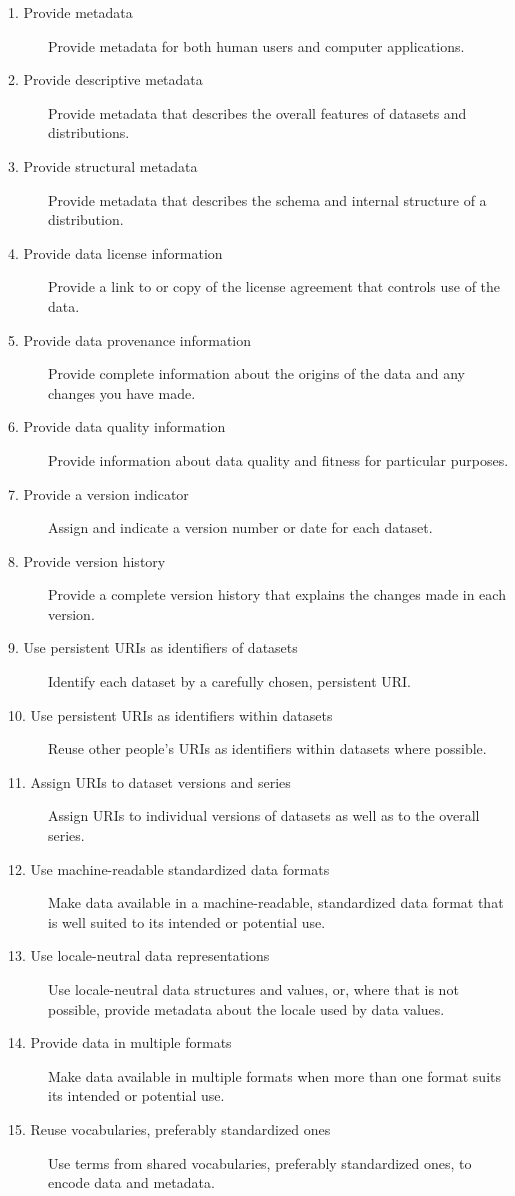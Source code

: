 \documentclass[a4paper,english,twoside,BCOR1.5cm,headsepline,DIV12,appendixprefix,final,12pt]{scrbook}
\begin{document}
\iffalse
\begin{description}
\item[1. Provide metadata] Provide metadata for both human users and computer applications.
\item[2. Provide descriptive metadata] Provide metadata that describes the overall features of datasets and distributions.
\item[3. Provide structural metadata] Provide metadata that describes the schema and internal structure of a distribution.
\item[4. Provide data license information] Provide a link to or copy of the license agreement that controls use of the data.
\item[5. Provide data provenance information] Provide complete information about the origins of the data and any changes you have made.
\item[6. Provide data quality information] Provide information about data quality and fitness for particular purposes.
\item[7. Provide a version indicator] Assign and indicate a version number or date for each dataset.
\item[8. Provide version history] Provide a complete version history that explains the changes made in each version.
\item[9. Use persistent URIs as identifiers of datasets] Identify each dataset by a carefully chosen, persistent URI. 
\item[10. Use persistent URIs as identifiers within datasets] Reuse other people's URIs as identifiers within datasets where possible.
\item[11. Assign URIs to dataset versions and series] Assign URIs to individual versions of datasets as well as to the overall series.
\item[12. Use machine-readable standardized data formats] Make data available in a machine-readable, standardized data format that is well suited to its intended or potential use.
\item[13. Use locale-neutral data representations] Use locale-neutral data structures and values, or, where that is not possible, provide metadata about the locale used by data values.
\item[14. Provide data in multiple formats] Make data available in multiple formats when more than one format suits its intended or potential use.
\item[15. Reuse vocabularies, preferably standardized ones] Use terms from shared vocabularies, preferably standardized ones, to encode data and metadata.

\end{description}
\end{document}
